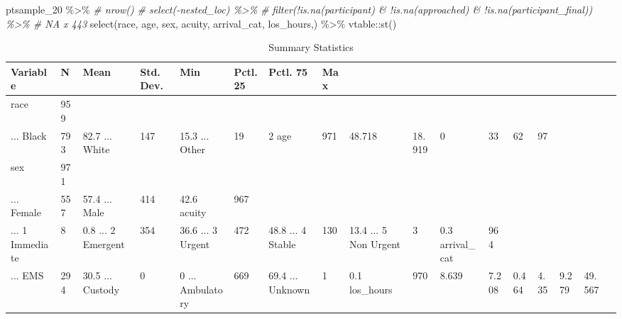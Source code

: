\documentclass[
]{article}
\newenvironment{Shaded}{\begin{snugshade}}{\end{snugshade}}
\newcommand{\CommentTok}[1]{\textcolor[rgb]{0.56,0.35,0.01}{\textit{#1}}}
\newcommand{\FunctionTok}[1]{\textcolor[rgb]{0.00,0.00,0.00}{#1}}
\newcommand{\NormalTok}[1]{#1}
\newcommand{\SpecialCharTok}[1]{\textcolor[rgb]{0.00,0.00,0.00}{#1}}
\begin{document}
\begin{Shaded}
\begin{Highlighting}[]
\NormalTok{ptsample\_20 }\SpecialCharTok{\%\textgreater{}\%}
  \CommentTok{\# nrow()}
  \CommentTok{\# select({-}nested\_loc) \%\textgreater{}\% }
  \CommentTok{\# filter(!is.na(participant) \& !is.na(approached) \& !is.na(participant\_final)) \%\textgreater{}\% \# NA x 443}
  \FunctionTok{select}\NormalTok{(race,}
\NormalTok{         age,}
\NormalTok{         sex,}
\NormalTok{         acuity, }
\NormalTok{         arrival\_cat,}
\NormalTok{         los\_hours,) }\SpecialCharTok{\%\textgreater{}\%}
\NormalTok{  vtable}\SpecialCharTok{::}\FunctionTok{st}\NormalTok{()}
\end{Highlighting}
\end{Shaded}

\begin{table}

\caption{\label{tab:pt_sample}Summary Statistics}
\centering
\begin{tabular}[t]{llllllll}
\toprule
Variable & N & Mean & Std. Dev. & Min & Pctl. 25 & Pctl. 75 & Max\\
\midrule
race & 959 &  &  &  &  &  & \\
... Black & 793 & 82.7%
... White & 147 & 15.3%
... Other & 19 & 2%
age & 971 & 48.718 & 18.919 & 0 & 33 & 62 & 97\\
\addlinespace
sex & 971 &  &  &  &  &  & \\
... Female & 557 & 57.4%
... Male & 414 & 42.6%
acuity & 967 &  &  &  &  &  & \\
... 1 Immediate & 8 & 0.8%
\addlinespace
... 2 Emergent & 354 & 36.6%
... 3 Urgent & 472 & 48.8%
... 4 Stable & 130 & 13.4%
... 5 Non Urgent & 3 & 0.3%
arrival_cat & 964 &  &  &  &  &  & \\
\addlinespace
... EMS & 294 & 30.5%
... Custody & 0 & 0%
... Ambulatory & 669 & 69.4%
... Unknown & 1 & 0.1%
los_hours & 970 & 8.639 & 7.208 & 0.464 & 4.35 & 9.279 & 49.567\\
\bottomrule
\end{tabular}
\end{table}
\end{document}

